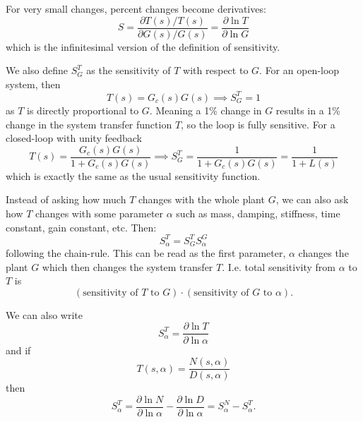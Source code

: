 For very small changes, percent changes become derivatives:
\begin{equation*}
  S = \frac{\partial T(s) / T(s)}{ \partial G(s) / G(s)} = \frac{\partial \ln T}{\partial \ln G}
\end{equation*}
which is the infinitesimal version of the definition of sensitivity.

We also define $S_G^{T}$ as the sensitivity of $T$ with respect to $G$.
For an open-loop system, then
\begin{equation*}
  T(s) = G_c(s) G(s) \implies S_G^{T} = 1
\end{equation*}
as $T$ is directly proportional to $G$.
Meaning a 1\% change in $G$ results in a 1\% change in the system transfer function $T$, so the loop is fully sensitive.
For a closed-loop with unity feedback
\begin{equation*}
  T(s) = \frac{G_c(s) G(s)}{1 + G_c(s) G(s)} \implies S_G^{T} = \frac{1}{1 + G_c(s) G(s)} = \frac{1}{1 + L(s)}
\end{equation*}
which is exactly the same as the usual sensitivity function.

Instead of asking how much $T$ changes with the whole plant $G$, we can also ask how $T$ changes with some parameter $\alpha$ such as mass, damping, stiffness, time constant, gain constant, etc.
Then:
\begin{equation*}
  S_{\alpha}^{T} = S_G^{T} S_{\alpha}^{G}
\end{equation*}
following the chain-rule.
This can be read as the first parameter, $\alpha$ changes the plant $G$ which then changes the system transfer $T$.
I.e. total sensitivity from $\alpha$ to $T$ is
\begin{equation*}
  (\text{sensitivity of } T \text{ to } G ) \cdot \left( \text{sensitivity of } G \text{ to } \alpha \right)
.\end{equation*}

We can also write
\begin{equation*}
  S_{\alpha}^{T} = \frac{\partial \ln T }{ \partial \ln \alpha}
\end{equation*}
and if
\begin{equation*}
  T(s, \alpha) = \frac{N(s, \alpha)}{D(s, \alpha)}
\end{equation*}
then
\begin{equation*}
  S_{\alpha}^{T} = \frac{\partial \ln N}{\partial \ln \alpha} - \frac{\partial \ln D}{\partial \ln \alpha} = S_{\alpha}^{N} - S_{\alpha}^{T}
.\end{equation*}


